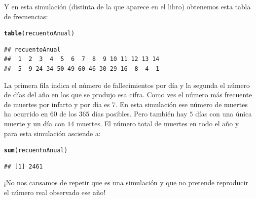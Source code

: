 \documentclass[10pt,a4paper]{article}\usepackage[]{graphicx}\usepackage[]{color}
\makeatletter
\newcommand{\hlstd}[1]{\textcolor[rgb]{0.345,0.345,0.345}{#1}}%
\newcommand{\hlkwd}[1]{\textcolor[rgb]{0.737,0.353,0.396}{\textbf{#1}}}%
\newenvironment{kframe}{%
 \def\at@end@of@kframe{}%
 \ifinner\ifhmode%
  \def\at@end@of@kframe{\end{minipage}}%
  \begin{minipage}{\columnwidth}%
 \fi\fi%
 \def\FrameCommand##1{\hskip\@totalleftmargin \hskip-\fboxsep
 \colorbox{shadecolor}{##1}\hskip-\fboxsep
     \hskip-\linewidth \hskip-\@totalleftmargin \hskip\columnwidth}%
 \MakeFramed {\advance\hsize-\width
   \@totalleftmargin\z@ \linewidth\hsize
   \@setminipage}}%
 {\par\unskip\endMakeFramed%
 \at@end@of@kframe}
\newenvironment{knitrout}{}{} %
\makeatother
\begin{document}
Y en esta simulación (distinta de la que aparece en el libro) obtenemos  esta tabla de frecuencias:
\begin{knitrout}
\color{fgcolor}\begin{kframe}
\begin{alltt}
\hlkwd{table}\hlstd{(recuentoAnual)}
\end{alltt}
\begin{verbatim}
## recuentoAnual
##  1  2  3  4  5  6  7  8  9 10 11 12 13 14 
##  5  9 24 34 50 49 60 46 30 29 16  8  4  1
\end{verbatim}
\end{kframe}
\end{knitrout}
La primera fila indica el número de fallecimientos por día y la segunda el número de días del año en los que se produjo esa cifra. Como ves el número más frecuente de muertes por infarto y por día es $7$. En esta simulación ese número de muertes ha ocurrido en $60$ de los $365$ días posibles. Pero también hay $5$ días con una única muerte y un día con $14$ muertes. El número total de muertes en todo el año y para esta simulación asciende a:
\begin{knitrout}
\color{fgcolor}\begin{kframe}
\begin{alltt}
\hlkwd{sum}\hlstd{(recuentoAnual)}
\end{alltt}
\begin{verbatim}
## [1] 2461
\end{verbatim}
\end{kframe}
\end{knitrout}
¡No nos cansamos de repetir que es una simulación y que no pretende reproducir el número real observado ese año!
\end{document}
